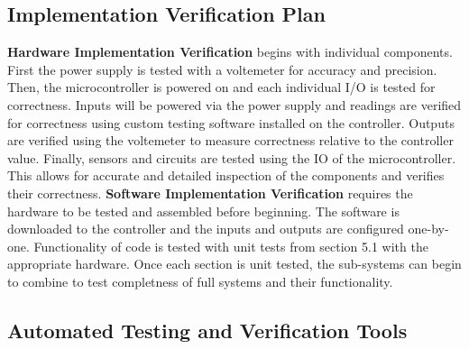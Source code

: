 \documentclass[12pt, titlepage]{article}
\begin{document}


\subsection{Implementation Verification Plan}
\textbf{Hardware Implementation Verification} begins with individual components. First 
the power supply is tested with a voltemeter for accuracy and precision. Then, 
the microcontroller is powered on and each individual I/O is tested for correctness. 
Inputs will be powered via the power supply and readings are verified for correctness 
using custom testing software installed on the controller. Outputs are verified using 
the voltemeter to measure correctness relative to the controller value. Finally, 
sensors and circuits are tested using the IO of the microcontroller. This allows
for accurate and detailed inspection of the components and verifies their correctness. 
\newline 
\newline 
\textbf{Software Implementation Verification} requires the hardware to be tested and 
assembled before beginning. The software is downloaded to the controller and the inputs 
and outputs are configured one-by-one. Functionality of code is tested with unit tests
from section 5.1 with the appropriate hardware. Once each section is unit tested, the
sub-systems can begin to combine to test completness of full systems and their functionality.


\subsection{Automated Testing and Verification Tools}
\end{document}

